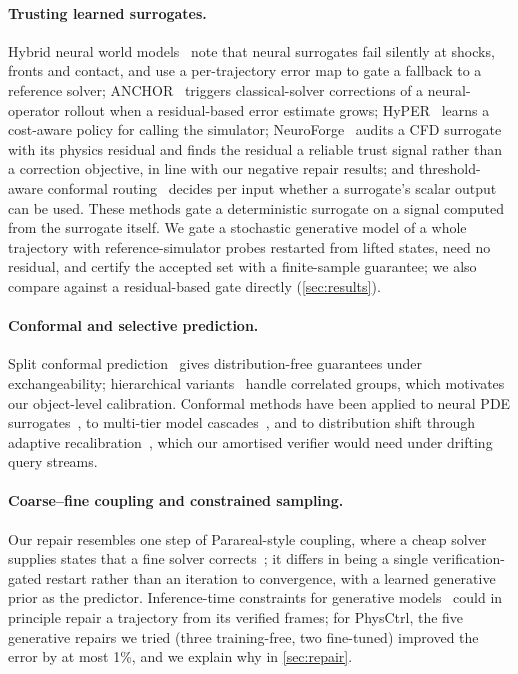 \paragraph{Trusting learned surrogates.}
Hybrid neural world models~\cite{lakshmanan2026hybrid} note that neural surrogates fail silently at shocks, fronts and contact, and use a per-trajectory error map to gate a fallback to a reference solver; ANCHOR~\cite{roy2025anchor} triggers classical-solver corrections of a neural-operator rollout when a residual-based error estimate grows; HyPER~\cite{srikishan2025model} learns a cost-aware policy for calling the simulator; NeuroForge~\cite{jabbary2026neuroforge} audits a CFD surrogate with its physics residual and finds the residual a reliable trust signal rather than a correction objective, in line with our negative repair results; and threshold-aware conformal routing~\cite{tan2026threshold} decides per input whether a surrogate's scalar output can be used.
These methods gate a deterministic surrogate on a signal computed from the surrogate itself.
We gate a stochastic generative model of a whole trajectory with reference-simulator probes restarted from lifted states, need no residual, and certify the accepted set with a finite-sample guarantee; we also compare against a residual-based gate directly (\cref{sec:results}).

\paragraph{Conformal and selective prediction.}
Split conformal prediction~\cite{angelopoulos2021gentle} gives distribution-free guarantees under exchangeability; hierarchical variants~\cite{dunn2023distribution} handle correlated groups, which motivates our object-level calibration.
Conformal methods have been applied to neural PDE surrogates~\cite{gopakumar2024uncertainty, gopakumar2025calibrated}, to multi-tier model cascades~\cite{dou2026conformal}, and to distribution shift through adaptive recalibration~\cite{gibbs2021adaptive}, which our amortised verifier would need under drifting query streams.

\paragraph{Coarse--fine coupling and constrained sampling.}
Our repair resembles one step of Parareal-style coupling, where a cheap solver supplies states that a fine solver corrects~\cite{pamela2025neural}; it differs in being a single verification-gated restart rather than an iteration to convergence, with a learned generative prior as the predictor.
Inference-time constraints for generative models~\cite{cohan2024flexible, utkarsh2025physics} could in principle repair a trajectory from its verified frames; for PhysCtrl, the five generative repairs we tried (three training-free, two fine-tuned) improved the error by at most 1\%, and we explain why in \cref{sec:repair}.
